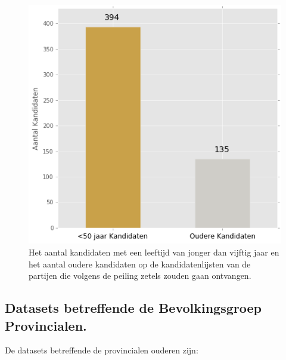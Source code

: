 \begin{figure}[H]
\centering
	\includegraphics[width=0.42\linewidth]{ja_kandidaten.png}

			\caption{Het aantal kandidaten met een leeftijd van jonger dan vijftig jaar en het aantal oudere kandidaten op de kandidatenlijsten \citep{Kiesraad_databank} van de partijen die volgens de peiling \citep{IPSOS} zetels zouden gaan ontvangen.}

\label{fig:jaKandidaten}
\end{figure}


\newpage
\subsection{Datasets betreffende de Bevolkingsgroep Provincialen.}
De datasets betreffende de provincialen ouderen zijn:\\

